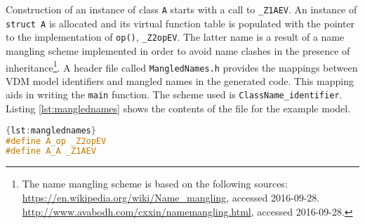 Construction of an instance of class \texttt{A} starts with a call to \texttt{\_Z1AEV}.
%
An instance of \texttt{struct A} is allocated and its virtual function table is populated with the pointer to the implementation of \texttt{op()}, \texttt{\_Z2opEV}.
%
The latter name is a result of a name mangling scheme implemented in order to avoid name clashes in the presence of inheritance\footnote{The name mangling scheme is based on the following sources:\\\url{https://en.wikipedia.org/wiki/Name_mangling}, accessed 2016-09-28.\\\url{http://www.avabodh.com/cxxin/namemangling.html}, accessed 2016-09-28.}.
%
A header file called \texttt{MangledNames.h} provides the mappings between VDM model identifiers and mangled names in the generated code.
%
This mapping aids in writing the \texttt{main} function.
%
The scheme used is \texttt{ClassName\_identifier}.
%
Listing \ref{lst:manglednames} shows the contents of the file for the example model.
%
%
%
\begin{lstlisting}[language=C,caption={File \texttt{MangledNames.h}.},label={lst:manglednames},frame=tlbr]{lst:manglednames}
#define A_op _Z2opEV
#define A_A _Z1AEV
\end{lstlisting}
%
%
%

